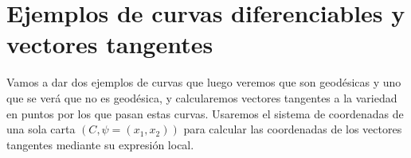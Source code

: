 \documentclass[twoside, 11pt]{article}
\theoremstyle{definition}
\newcommand{\R}{\mathbb{R}}
\begin{document}
\section{Ejemplos de curvas diferenciables y vectores tangentes}



Vamos a dar dos ejemplos de curvas que luego veremos que son geodésicas y uno que se verá que no es geodésica, y calcularemos vectores tangentes a la variedad en puntos por los que pasan estas curvas. Usaremos el sistema de coordenadas de una sola carta $(C, \psi=(x_1,x_2))$ para calcular las coordenadas de los vectores tangentes mediante su expresión local.

%
%
%
\end{document}
